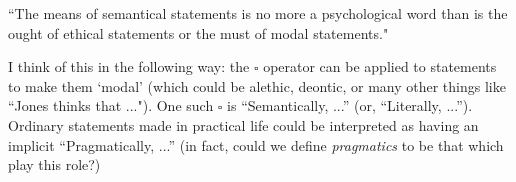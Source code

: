 ``The means of semantical statements is no more a psychological word than is
the ought of ethical statements or the must of modal statements."

I think of this in the following way: the $\square$ operator can be applied to
statements to make them `modal' (which could be alethic, deontic, or many other
things like ``Jones thinks that ..."). One such $\square$ is ``Semantically,
...'' (or, ``Literally, ...''). Ordinary statements made in practical life
 could be interpreted as having an implicit ``Pragmatically, ...'' (in fact,
 could we define \emph{pragmatics} to be that which play this role?)